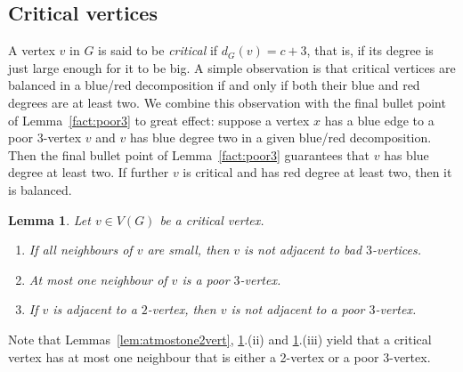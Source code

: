 \documentclass[11pt, reqno, a4paper]{article}
\newtheorem{lemma}{Lemma}[section]
\theoremstyle{definition}
\numberwithin{equation}{section}
\begin{document}
\subsection{Critical vertices}\label{subsec:crit}
A vertex $v$ in $G$ is said to be \emph{critical} if $d_G(v)=c+3$, that is, if its degree is just large enough for it to be big.
A simple observation is that critical vertices are balanced in a blue/red decomposition if and only if both their blue and red degrees are at least two.
We combine this observation with the final bullet point of Lemma~\ref{fact:poor3} to great effect: suppose a vertex $x$ has a blue edge to a poor \(3\)-vertex $v$ and $v$ has blue degree two in a given blue/red decomposition. Then the final bullet point of Lemma~\ref{fact:poor3} guarantees that \(v\) has blue degree at least two.
If further $v$ is critical and has red degree at least two, then it is balanced.
\begin{lemma}\label{lem:7verts} 
Let $v\in V(G)$ be a critical vertex.
\begin{enumerate}[noitemsep, label=\emph{(}\roman*\emph{)}]
\item If all neighbours of $v$ are small, then $v$ is not adjacent to bad $3$-vertices.
\item At most one neighbour of $v$ is a poor $3$-vertex.
\item If $v$ is adjacent to a $2$-vertex, then \(v\) is not adjacent to a poor $3$-vertex.
\end{enumerate}
\end{lemma}
Note that Lemmas~\ref{lem:atmostone2vert}, \ref{lem:7verts}.(ii) and \ref{lem:7verts}.(iii) yield that a critical vertex has at most one neighbour that is either a 2-vertex or a poor 3-vertex.
\end{document}
